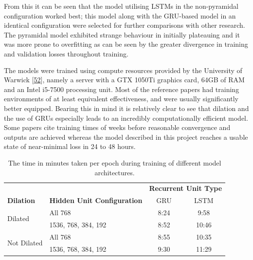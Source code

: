 \documentclass[12pt,]{article}
\begin{document}
From this it can be seen that the model utilising LSTMs in the
non-pyramidal configuration worked best; this model along with the
GRU-based model in an identical configuration were selected for further
comparisons with other research. The pyramidal model exhibited strange
behaviour in initially plateauing and it was more prone to overfitting
as can be seen by the greater divergence in training and validation
losses throughout training.

The models were trained using compute resources provided by the
University of Warwick
{[}\protect\hyperlink{ref-warwickcomputenodes}{52}{]}, namely a server
with a GTX 1050Ti graphics card, 64GB of RAM and an Intel i5-7500
processing unit. Most of the reference papers had training environments
of at least equivalent effectiveness, and were usually significantly
better equipped. Bearing this in mind it is relatively clear to see that
dilation and the use of GRUs especially leads to an incredibly
computationally efficient model. Some papers cite training times of
weeks before reasonable convergence and outputs are achieved whereas the
model described in this project reaches a usable state of near-minimal
loss in 24 to 48 hours.

\setlength\extrarowheight{1pt}
\begin{table}[H]
\centering
\caption{The time in minutes taken per epoch during training of different model architectures.}
\vspace{1em}
\begin{tabular}{llcc} 
\toprule
                             &                                    & \multicolumn{2}{c}{\textbf{Recurrent Unit Type}}  \\
\textbf{Dilation}            & \textbf{Hidden Unit Configuration} & GRU   & LSTM                                      \\ 
\hline
\multirow{2}{*}{Dilated}     & All 768                            & 8:24  & 9:58                                      \\ 
                             & 1536, 768, 384, 192                & 8:52  & 10:46                                     \\ 
\multirow{2}{*}{Not Dilated} & All 768                            & 8:55  & 10:35                                     \\ 
                             & 1536, 768, 384, 192                & 9:30  & 11:29                                     \\
\bottomrule
\end{tabular}
\end{table}
\end{document}

